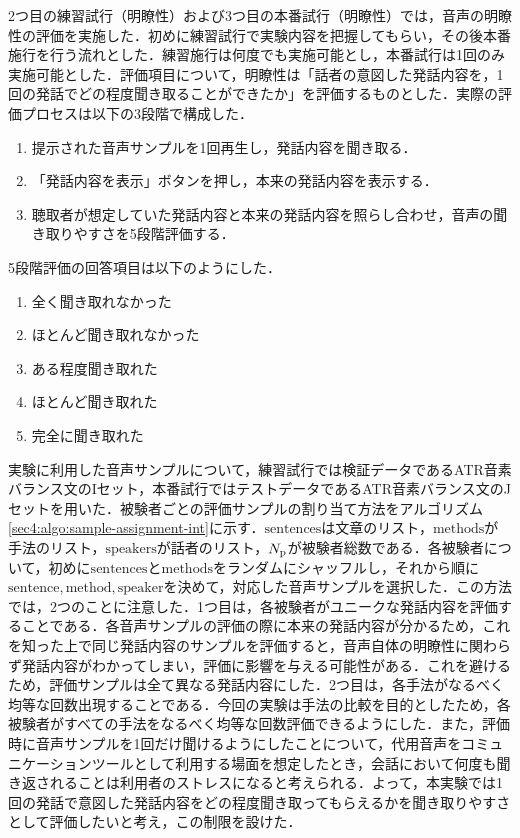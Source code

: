 2つ目の練習試行（明瞭性）および3つ目の本番試行（明瞭性）では，音声の明瞭性の評価を実施した．初めに練習試行で実験内容を把握してもらい，その後本番施行を行う流れとした．練習施行は何度でも実施可能とし，本番試行は1回のみ実施可能とした．評価項目について，明瞭性は「話者の意図した発話内容を，1回の発話でどの程度聞き取ることができたか」を評価するものとした．実際の評価プロセスは以下の3段階で構成した．
\begin{enumerate}
    \item 提示された音声サンプルを1回再生し，発話内容を聞き取る．
    \item 「発話内容を表示」ボタンを押し，本来の発話内容を表示する．
    \item 聴取者が想定していた発話内容と本来の発話内容を照らし合わせ，音声の聞き取りやすさを5段階評価する．
\end{enumerate}
5段階評価の回答項目は以下のようにした．
\begin{enumerate}
    \item 全く聞き取れなかった
    \item ほとんど聞き取れなかった
    \item ある程度聞き取れた
    \item ほとんど聞き取れた
    \item 完全に聞き取れた
\end{enumerate}
実験に利用した音声サンプルについて，練習試行では検証データであるATR音素バランス文のIセット，本番試行ではテストデータであるATR音素バランス文のJセットを用いた．被験者ごとの評価サンプルの割り当て方法をアルゴリズム\ref{sec4:algo:sample-assignment-int}に示す．$\text{sentences}$は文章のリスト，$\text{methods}$が手法のリスト，$\text{speakers}$が話者のリスト，$N_{\text{p}}$が被験者総数である．各被験者について，初めに$\text{sentences}$と$\text{methods}$をランダムにシャッフルし，それから順に$\text{sentence}, \text{method}, \text{speaker}$を決めて，対応した音声サンプルを選択した．この方法では，2つのことに注意した．1つ目は，各被験者がユニークな発話内容を評価することである．各音声サンプルの評価の際に本来の発話内容が分かるため，これを知った上で同じ発話内容のサンプルを評価すると，音声自体の明瞭性に関わらず発話内容がわかってしまい，評価に影響を与える可能性がある．これを避けるため，評価サンプルは全て異なる発話内容にした．2つ目は，各手法がなるべく均等な回数出現することである．今回の実験は手法の比較を目的としたため，各被験者がすべての手法をなるべく均等な回数評価できるようにした．また，評価時に音声サンプルを1回だけ聞けるようにしたことについて，代用音声をコミュニケーションツールとして利用する場面を想定したとき，会話において何度も聞き返されることは利用者のストレスになると考えられる．よって，本実験では1回の発話で意図した発話内容をどの程度聞き取ってもらえるかを聞き取りやすさとして評価したいと考え，この制限を設けた．
